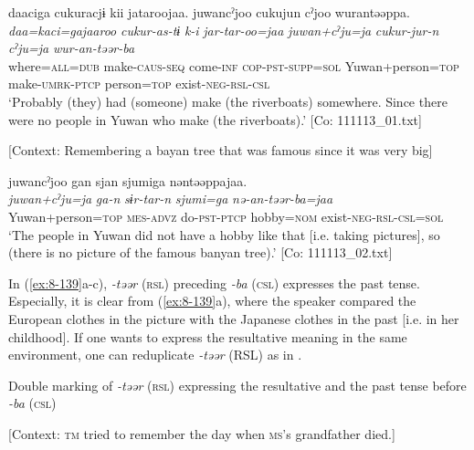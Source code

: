 \ex
{\TM}
\glll  daaciga{\footnotemark} cukuracjɨ  kii  jataroojaa.      juwancˀjoo  cukujun  cˀjoo  wurantəəppa.\\
\textit{daa=kaci=gajaaroo}  \textit{cukur-as-tɨ}  \textit{k-i}  \textit{jar-tar-oo=jaa}      \textit{juwan+cˀju=ja}  \textit{cukur-jur-n}  \textit{cˀju=ja}  \textit{wur-an-təər-ba}\\
where=\textsc{all}=\textsc{dub}  make-\textsc{caus}-\textsc{seq}  come-\textsc{inf}  \textsc{cop}-\textsc{pst}-\textsc{supp}=\textsc{sol}   Yuwan+person=\textsc{top}  make-\textsc{umrk}-\textsc{ptcp}  person=\textsc{top}  exist-\textsc{neg}-\textsc{rsl}-\textsc{csl}\\
\glt ‘Probably (they) had (someone) make (the riverboats) somewhere. Since there were no people in Yuwan who make (the riverboats).’ [Co: 111113\_01.txt]

\ex {}[Context: Remembering a bayan tree that was famous since it was very big]

{\TM}
\glll  juwancˀjoo  gan  sjan  {\textbar}sjumi{\textbar}ga      nəntəəppajaa.\\
\textit{juwan+cˀju=ja}  \textit{ga-n}  \textit{sɨr-tar-n}  \textit{sjumi=ga}      \textit{nə-an-təər-ba=jaa}\\
Yuwan+person=\textsc{top}  \textsc{mes}-\textsc{advz}  do-\textsc{pst}-\textsc{ptcp}  hobby=\textsc{nom} exist-\textsc{neg}-\textsc{rsl}-\textsc{csl}=\textsc{sol}\\
\glt ‘The people in Yuwan did not have a hobby like that [i.e. taking pictures], so (there is no picture of the famous banyan tree).’ [Co: 111113\_02.txt]
\z
\z

In (\ref{ex:8-139}a-c), \textit{-təər} (\textsc{rsl}) preceding \textit{-ba} (\textsc{csl}) expresses the past tense. Especially, it is clear from (\ref{ex:8-139}a), where the speaker compared the European clothes in the picture with the Japanese clothes in the past [i.e. in her childhood]. If one wants to express the resultative meaning in the same environment, one can reduplicate \textit{-təər} (RSL) as in .

\ea\label{ex:8-140}
  Double marking of \textit{-təər} (\textsc{rsl}) expressing the resultative and the past tense before \textit{-ba} (\textsc{csl})

  [Context: \textsc{tm} tried to remember the day when \textsc{ms}’s grandfather died.]

